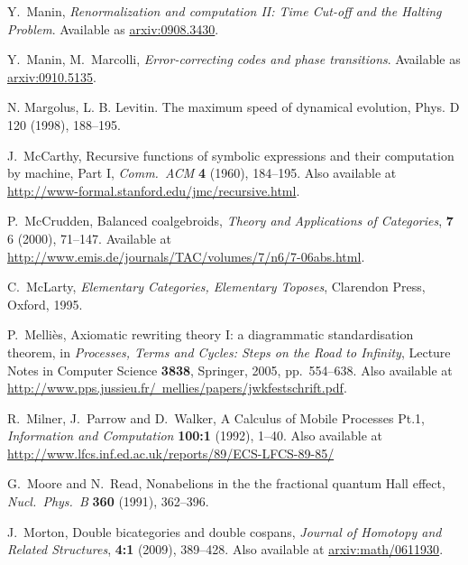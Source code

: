 \documentclass[12pt,twoside,openright]{report}
\begin{document}
\begin{thebibliography}{99}
 Y.\ Manin, \textsl{Renormalization and computation II: Time Cut-off and the Halting Problem}. Available as
\href{http://arxiv.org/abs/0908.3430}{arxiv:0908.3430}.

 Y.\ Manin, M.\ Marcolli, \textsl{Error-correcting codes and phase transitions}. Available as
\href{http://arxiv.org/abs/0910.5135}{arxiv:0910.5135}.

 N. Margolus, L. B. Levitin. The maximum speed of dynamical evolution, Phys. D 120 (1998), 188--195.

 J.\ McCarthy, Recursive functions of symbolic expressions and their computation by machine, Part I, 
{\sl Comm.\ ACM} {\bf 4} (1960), 184--195.  Also available at 
\href{http://www-formal.stanford.edu/jmc/recursive.html}
{http://www-formal.stanford.edu/jmc/recursive.html}.

 P.\ McCrudden, Balanced coalgebroids, \textsl{Theory and Applications of Categories}, \textbf{7} 6 (2000), 71--147.  Available at \href{http://www.emis.de/journals/TAC/volumes/7/n6/7-06abs.html}{http://www.emis.de/journals/TAC/volumes/7/n6/7-06abs.html}.

 C.\ McLarty, {\sl Elementary Categories, Elementary Toposes}, Clarendon Press, Oxford, 1995.

 P.\ Melli\`es, Axiomatic rewriting theory I: a diagrammatic standardisation theorem, in {\sl Processes, Terms and Cycles: Steps on the Road to Infinity}, Lecture Notes in Computer Science {\bf 3838}, Springer, 2005, pp.\ 554--638.  Also available at 
\href{http://www.pps.jussieu.fr/~mellies/papers/jwkfestschrift.pdf}
{http://www.pps.jussieu.fr/~mellies/papers/jwkfestschrift.pdf}.

 R.\ Milner, J.\ Parrow and D.\ Walker, A Calculus of Mobile Processes Pt.1, {\sl Information and Computation} {\bf 100:1} (1992), 1--40. Also available at \href{http://www.lfcs.inf.ed.ac.uk/reports/89/ECS-LFCS-89-85/}{http://www.lfcs.inf.ed.ac.uk/reports/89/ECS-LFCS-89-85/}

 G.\ Moore and N.\ Read, Nonabelions in the the fractional quantum Hall effect, {\sl Nucl.\ Phys.\ B} 
{\bf 360} (1991), 362--396.

 J.\ Morton, Double bicategories and double cospans, \textsl{Journal of Homotopy and Related Structures}, \textbf{4:1} (2009), 389--428.  Also available at \href{http://arxiv.org/abs/math/0611930}{arxiv:math/0611930}.


\end{thebibliography}
\end{document}
